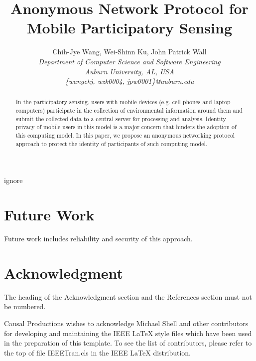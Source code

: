 \documentclass[10pt,conference,letterpaper]{IEEEtran}
\title{Anonymous Network Protocol for Mobile Participatory Sensing}
\author{
Chih-Jye Wang, Wei-Shinn Ku, John Patrick Wall
\vspace{1.6mm}\\
\fontsize{10}{10}\selectfont\itshape
Department of Computer Science and Software Engineering\\
Auburn University, AL, USA\\
\fontsize{9}{9}\selectfont\ttfamily\upshape
\{wangchj, wzk0004, jpw0001\}@auburn.edu\\
}
\begin{document}
\maketitle

\begin{abstract}
In the participatory sensing, users with mobile devices (e.g. cell phones
and laptop computers) participate in the collection of environmental
information around them and submit the collected data to a central server
for processing and analysis. Identity privacy of mobile users in this model
is a major concern that hinders the adoption of this computing model. In
this paper, we propose an anonymous networking protocol approach to protect
the identity of participants of such computing model.
\end{abstract}

\begin{keywords}
ignore
\end{keywords}
%






%

\section{Future Work}
Future work includes reliability and security of this approach.


%



\section*{Acknowledgment}

The heading of the Acknowledgment section and the References section
must not be numbered.

Causal Productions wishes to acknowledge Michael Shell and other
contributors for developing and maintaining the IEEE LaTeX style files
which have been used in the preparation of this template.  To see the
list of contributors, please refer to the top of file IEEETran.cls in
the IEEE LaTeX distribution.



\end{document}
